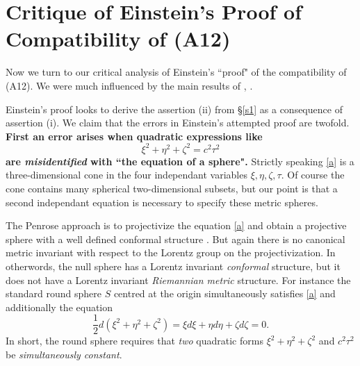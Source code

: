 \documentclass[12pt]{article}
\newcommand{\bR}{\mathbb{R}}
\begin{document}





\section{Critique of Einstein's Proof of Compatibility of (A12)}\label{einsteinproof}
Now we turn to our critical analysis of Einstein's ``proof" of the compatibility of (A12). We were much influenced by the main results of \cite{bryant}, \cite{crothers}. 

Einstein's proof looks to derive the assertion (ii) from \S \ref{s1} as a consequence of assertion (i). We claim that the errors in Einstein's attempted proof are twofold. \textbf{First an error arises when quadratic expressions like \begin{equation}\label{a}\xi^2+\eta^2+\zeta^2=c^2 \tau^2
\end{equation} are \emph{misidentified} with ``the equation of a sphere".} Strictly speaking \eqref{a} is a three-dimensional cone in the four independant variables $\xi, \eta, \zeta, \tau$. Of course the cone contains many spherical two-dimensional subsets, but our point is that a second independant equation is necessary to specify these metric spheres. 

The Penrose approach is to projectivize the equation \eqref{a} and obtain a projective sphere with a well defined conformal structure \cite[Ch 1.]{penrose1984spinors}. But again there is no canonical metric invariant with respect to the Lorentz group on the projectivization. In otherwords, the null sphere has a Lorentz invariant \emph{conformal} structure, but it does not have a Lorentz invariant \emph{Riemannian metric} structure. For instance the standard round sphere $S$ centred at the origin simultaneously satisfies \eqref{a} and additionally the equation $$\frac{1}{2}d(\xi^2+\eta^2+\zeta^2)=\xi d\xi+\eta d\eta +\zeta d\zeta=0.$$ In short, the round sphere requires that \emph{two} quadratic forms $\xi^2+\eta^2+\zeta^2$ and $c^2\tau^2$ be \emph{simultaneously constant}. 
\end{document}
